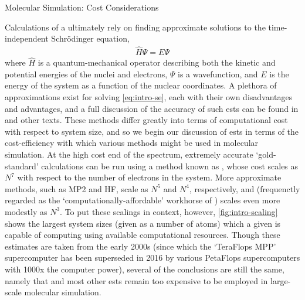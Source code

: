 \begin{section}{Molecular Simulation: Cost Considerations}

Calculations of a \pes ultimately rely on finding approximate solutions to
the time-independent Schr\"odinger equation,
\begin{align}
\label{eq:intro-se}
\hat{H}\Psi = E\Psi
\end{align}
where $\hat{H}$ is a quantum-mechanical operator describing both the kinetic
and potential energies of the nuclei and electrons, $\Psi$ is a wavefunction,
and $E$ is the energy of the system as a function of the nuclear coordinates. A plethora of
approximations exist for solving \cref{eq:intro-se}, each with their own
disadvantages and advantages, and a full discussion of the accuracy of such
\glspl{est} can be found in \citet{Cramer2004} and other texts.
These methods differ greatly into terms of
computational cost with respect to system size, and so we begin our
discussion of \glspl{est} in terms of the cost-efficiency with which various
methods might be used in molecular simulation.
%
At the high cost end of the spectrum, extremely accurate `gold-standard' \est
calculations can be run using a method known as
\ccsdt, whose cost scales as $N^7$
with respect to the number of electrons in the system. More approximate
methods, such as
MP2 and HF, scale as $N^5$ and $N^4$, respectively, and \dft (frequenctly regarded
as the 
`computationally-affordable' workhorse of \est) scales even more modestly as $N^3$.
To put these scalings in context,
however,
\cref{fig:intro-scaling} shows the largest system sizes (given as a number of
atoms) which a given \est is capable of computing using available
computational resources. 
Though these estimates are taken from the early 2000s (since which
the `TeraFlops MPP' supercomputer has been superseded in 2016 by
various PetaFlops supercomputers with 1000x the computer power), several of
the conclusions are still the same, namely that \ccsdt and most other
\glspl{est} remain too expensive to be employed in large-scale molecular
simulation.


\end{section}
